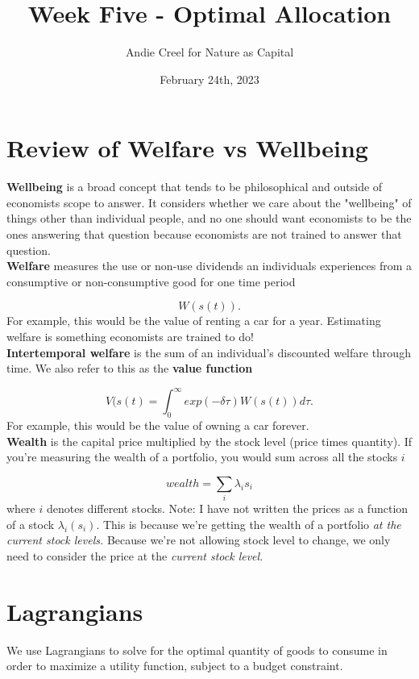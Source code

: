 \documentclass{article}
\title{Week Five - Optimal Allocation}
\author{Andie Creel for Nature as Capital}
\date{February 24th, 2023}
\begin{document}
\maketitle

\section{Review of Welfare vs Wellbeing}
\textbf{Wellbeing} is a broad concept that tends to be philosophical and outside of economists scope to answer. It considers whether we care about the "wellbeing" of things other than individual people, and no one should want economists to be the ones answering that question because economists are not trained to answer that question. \\

\textbf{Welfare} measures the use or non-use dividends an individuals experiences from a consumptive or non-consumptive good for one time period

$$W(s(t)).$$
For example, this would be the value of renting a car for a year. Estimating welfare is something economists are trained to do! \\

\textbf{Intertemporal welfare} is the sum of an individual's discounted welfare through time. We also refer to this as the \textbf{value function} 

$$V(s(t) = \int_0^\infty exp(-\delta \tau ) W(s(t)) d \tau.$$
For example, this would be the value of owning a car forever. \\

\textbf{Wealth} is the capital price multiplied by the stock level (price times quantity). If you're measuring the wealth of a portfolio, you would sum across all the stocks $i$

$$wealth = \sum_i \lambda_i s_i$$
where $i$ denotes different stocks. Note: I have not written the prices as a function of a stock $\lambda_i(s_i)$. This is because we're getting the wealth of a portfolio \textit{at the current stock levels.} Because we're not allowing stock level to change, we only need to consider the price at the \textit{current stock level}.

\section{Lagrangians}
We use Lagrangians to solve for the optimal quantity of goods to consume in order to maximize a utility function, subject to a budget constraint.\\
\end{document}
